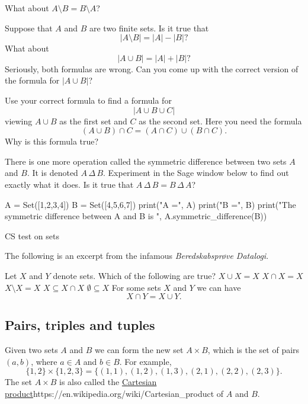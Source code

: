 \documentclass{article}
\begin{document}
What about $A\setminus B = B\setminus A$?

Suppose that $A$ and $B$ are two finite sets. Is it true that
$$
|A\setminus B| = |A| - |B|?
$$
What about
$$
|A\cup B| = |A| + |B|?
$$
Seriously, both formulas are wrong. Can you come up with the correct
version of the formula for $|A \cup B|$?

Use your correct formula to find a formula for
$$
|A\cup B \cup C|
$$
viewing $A\cup B$ as the first set and $C$ as the second set. Here you need
the formula
$$
(A\cup B)\cap C = (A\cap C) \cup (B\cap C).
$$
Why is this formula true?
\endshex

\beginshex
There is one more operation called the symmetric difference between two sets $A$ and $B$. It is
denoted $A\, \Delta\, B$. Experiment in the Sage window below to find out exactly what it does.
Is it true that $A\, \Delta\, B = B\, \Delta\, A$?

\begin{sage}
A = Set([1,2,3,4])
B = Set([4,5,6,7])
print("A =", A)
print("B =", B)
print("The symmetric difference between A and B is ", A.symmetric_difference(B))
\end{sage}
\endshex

\begin{hideinbutton}{CS test on sets}

The following is an excerpt from the infamous \emph{Beredskabsprøve Datalogi}.

\begin{quiz}
\question
Let $X$ and $Y$ denote sets. Which of the following are true?
$X \cup X = X$
$X\cap X = X$
$X\setminus X = X$
$X\subseteq X\cap X$
$\emptyset \subseteq X$
For some sets $X$ and $Y$ we can have
$$
X\cap Y = X\cup Y.
$$
\end{quiz}
\end{hideinbutton}

\subsection{Pairs, triples and tuples}

Given two sets $A$ and $B$ we can form the new set $A\times B$,
which is the set of pairs $(a, b)$, where $a\in A$ and
$b\in B$. For example,
$$
\{1, 2\}\times \{1, 2, 3\} = 
\{(1, 1), (1, 2), (1, 3), (2, 1), (2, 2), (2, 3)\}.
$$
The set $A\times B$ is also called the \url{Cartesian
  product}{https://en.wikipedia.org/wiki/Cartesian_product} of $A$ and
$B$.
\end{document}
